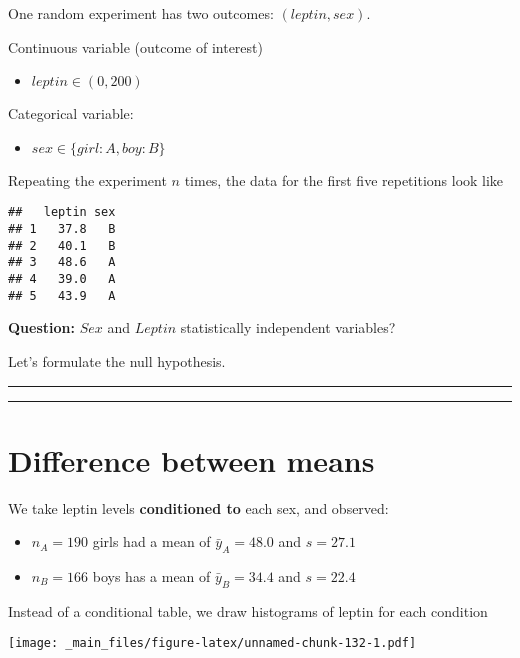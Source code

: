 \documentclass[
]{book}
\providecommand{\tightlist}{%
  \setlength{\itemsep}{0pt}\setlength{\parskip}{0pt}}
\begin{document}
One random experiment has two outcomes: \((leptin, sex)\).

Continuous variable (outcome of interest)

\begin{itemize}
\tightlist
\item
  \(leptin \in (0, 200)\)
\end{itemize}

Categorical variable:

\begin{itemize}
\tightlist
\item
  \(sex \in \{girl:A,boy:B\}\)
\end{itemize}

Repeating the experiment \(n\) times, the data for the first five repetitions look like

\begin{verbatim}
##   leptin sex
## 1   37.8   B
## 2   40.1   B
## 3   48.6   A
## 4   39.0   A
## 5   43.9   A
\end{verbatim}

\textbf{Question:} \(Sex\) and \(Leptin\) statistically independent variables?

Let's formulate the null hypothesis.

\begin{center}\rule{0.5\linewidth}{0.5pt}\end{center}

\begin{center}\rule{0.5\linewidth}{0.5pt}\end{center}

\hypertarget{difference-between-means-3}{%
\section{Difference between means}\label{difference-between-means-3}}

We take leptin levels \textbf{conditioned to} each sex, and observed:

\begin{itemize}
\item
  \(n_A=190\) girls had a mean of \(\bar{y}_A=48.0\) and \(s=27.1\)
\item
  \(n_B=166\) boys has a mean of \(\bar{y}_B=34.4\) and \(s=22.4\)
\end{itemize}

Instead of a conditional table, we draw histograms of leptin for each condition

\texttt{[image: \_main\_files/figure-latex/unnamed-chunk-132-1.pdf]}
\end{document}

